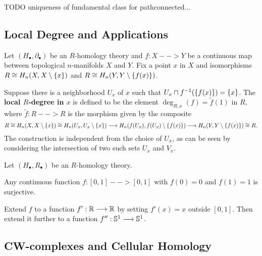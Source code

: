 	\begin{lemma}
		TODO uniqueness of fundamental class for pathconnected...
	\end{lemma}

	\newpage
	\subsection{Local Degree and Applications}

	\begin{definition}
		Let $(H_\bullet, \partial_\bullet)$ be an $R$-homology theory and $f:X-->Y$ be a continuous map between topological $n$-manifolds $X$ and $Y$. Fix a point $x$ in $X$ and isomorphisms $R \isom H_n(X,X\setminus\{x\})$ and $R \isom H_n(Y,Y\setminus\{f(x)\})$.

		Suppose there is a neighborhood $U_x$ of $x$ such that $U_x \intersection f^{-1}(\{f(x)\}) = \{x\}$. The \textbf{local $R$-degree in $x$} is defined to be the element $\deg_{R,x}(f) = \widetilde{f}(1)$ in $R$, where $\widetilde{f}:R-->R$ is the morphism given by the composite
		\begin{equation*}
			R \isom H_n(X,X\setminus \{x\}) \isom H_n(U_x,U_x \setminus \{x\}) \longrightarrow H_n(f(U_x),f(U_x)\setminus \{f(x)\}) \longrightarrow H_n(Y,Y \setminus \{f(x)\}) \isom R.
		\end{equation*}
		The construction is independent from the choice of $U_x$, as can be seen by considering the intersection of two such sets $U_x$ and $V_x$.
	\end{definition}

	\begin{lemma}
		Let $(H_\bullet, R_\bullet)$ be an $R$-homology theory.

		Any continuous function $f:[0,1] --> [0,1]$ with $f(0) = 0$ and $f(1) = 1$ is surjective.
	\end{lemma}
	\begin{sketch}
		Extend $f$ to a function $f':\R --> \R$ by setting $f'(x) = x$ outside $[0,1]$. Then extend it further to a function $f'': \S^1 --> \S^1$.
	\end{sketch}

	\newpage
	\subsection{CW-complexes and Cellular Homology}


